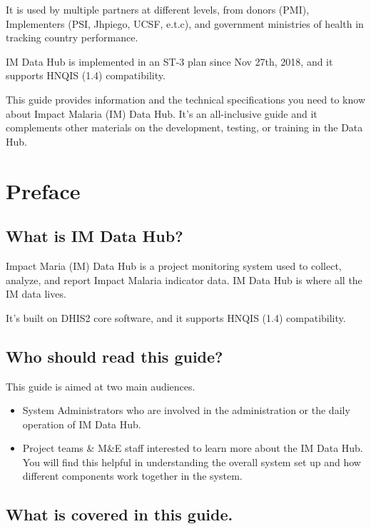 \documentclass[]{book}
\providecommand{\tightlist}{%
  \setlength{\itemsep}{0pt}\setlength{\parskip}{0pt}}
\begin{document}
It is used by multiple partners at different levels, from donors (PMI), Implementers (PSI, Jhpiego, UCSF, e.t.c), and government ministries of health in tracking country performance.

IM Data Hub is implemented in an ST-3 plan since Nov 27th, 2018, and it supports HNQIS (1.4) compatibility.

This guide provides information and the technical specifications you need to know about Impact Malaria (IM) Data Hub. It's an all-inclusive guide and it complements other materials on the development, testing, or training in the Data Hub.

\hypertarget{preface}{%
\chapter*{Preface}\label{preface}}

\hypertarget{what-is-im-data-hub}{%
\section{What is IM Data Hub?}\label{what-is-im-data-hub}}

Impact Maria (IM) Data Hub is a project monitoring system used to collect, analyze, and report Impact Malaria indicator data. IM Data Hub is where all the IM data lives.

It's built on DHIS2 core software, and it supports HNQIS (1.4) compatibility.

\hypertarget{who-should-read-this-guide}{%
\section{Who should read this guide?}\label{who-should-read-this-guide}}

This guide is aimed at two main audiences.

\begin{itemize}
\tightlist
\item
  System Administrators who are involved in the administration or the daily operation of IM Data Hub.
\item
  Project teams \& M\&E staff interested to learn more about the IM Data Hub. You will find this helpful in understanding the overall system set up and how different components work together in the system.
\end{itemize}

\hypertarget{what-is-covered-in-this-guide.}{%
\section{What is covered in this guide.}\label{what-is-covered-in-this-guide.}}
\end{document}
